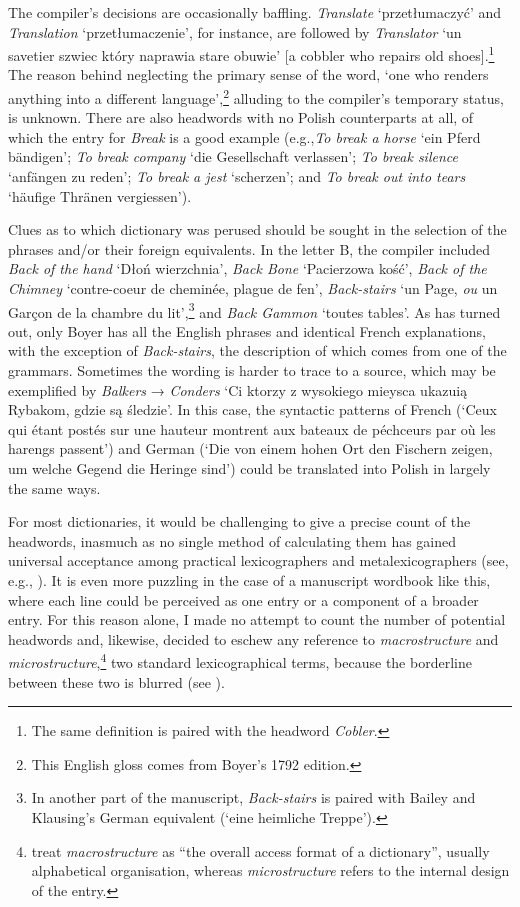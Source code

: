 \documentclass[output=paper,colorlinks,citecolor=brown,arabicfont,chinesefont]{langscibook}
\begin{document}
The compiler’s decisions are occasionally baffling. \emph{Translate} ‘przetłumaczyć’ and \emph{Translation} ‘przetłumaczenie’, for instance, are followed by \emph{Translator} ‘un savetier szwiec który naprawia stare obuwie’ [a cobbler who repairs old shoes].\footnote{The same definition is paired with the headword \emph{Cobler}.} The reason behind neglecting the primary sense of the word, ‘one who renders anything into a different language’,\footnote{This English gloss comes from Boyer’s 1792 edition.} alluding to the compiler’s temporary status, is unknown. There are also headwords with no Polish counterparts at all, of which the entry for \emph{Break} is a good example (e.g.,\emph{To break a horse} ‘ein Pferd bändigen’; \emph{To break company} ‘die Gesellschaft verlassen’; \emph{To break silence} ‘anfängen zu reden’; \emph{To break a jest} ‘scherzen’; and \emph{To break out into tears} ‘häufige Thränen vergiessen’).

Clues as to which dictionary was perused should be sought in the selection of the phrases and/or their foreign equivalents. In the letter B, the compiler included \emph{Back of the hand} ‘Dłoń wierzchnia’, \emph{Back Bone} ‘Pacierzowa kość’, \emph{Back of the Chimney} ‘contre-coeur de cheminée, plague de fen’, \emph{Back-stairs} ‘un Page, \emph{ou} un Garçon de la chambre du lit’,\footnote{In another part of the manuscript, \emph{Back-stairs} is paired with Bailey and Klausing’s German equivalent (‘eine heimliche Treppe’).} and \emph{Back Gammon} ‘toutes tables’. As has turned out, only Boyer has all the English phrases and identical French explanations, with the exception of \emph{Back-stairs}, the description of which comes from one of the grammars. Sometimes the wording is harder to trace to a source, which may be exemplified by \emph{Balkers} → \emph{Conders} ‘Ci ktorzy z wysokiego mieysca ukazuią Rybakom, gdzie są śledzie’. In this case, the syntactic patterns of French (‘Ceux qui étant postés sur une hauteur montrent aux bateaux de péchceurs par où les harengs passent’) and German (‘Die von einem hohen Ort den Fischern zeigen, um welche Gegend die Heringe sind’) could be translated into Polish in largely the same ways. 

For most dictionaries, it would be challenging to give a precise count of the headwords, inasmuch as no single method of calculating them has gained universal acceptance among practical lexicographers and metalexicographers (see, e.g., \citealt[109--112]{Landau2001}). It is even more puzzling in the case of a manuscript wordbook like this, where each line could be perceived as one entry or a component of a broader entry. For this reason alone, I made no attempt to count the number of potential headwords and, likewise, decided to eschew any reference to \emph{macrostructure} and \emph{microstructure},\footnote{\citet[xii, 94]{HartmannJames2001} treat \textit{macrostructure} as “the overall access format of a dictionary”, usually alphabetical organisation, whereas \emph{microstructure} refers to the internal design of the entry.} two standard lexicographical terms, because the borderline between these two is blurred (see ).
\end{document}
